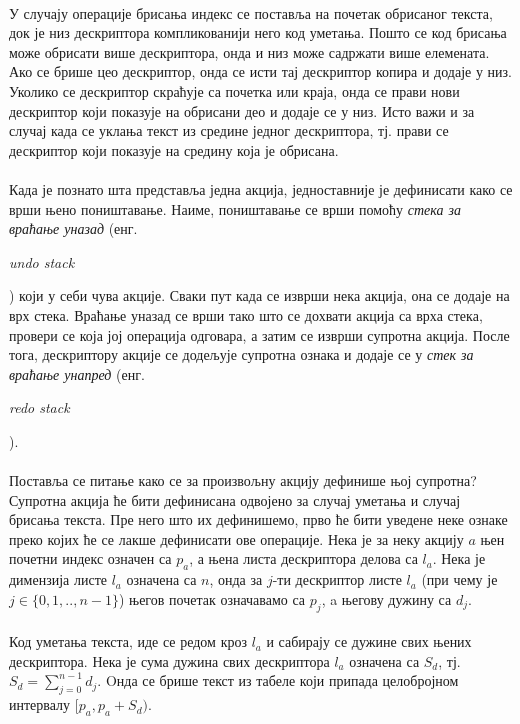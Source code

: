 \documentclass[12pt,oneside]{memoir}
\begin{document}
\paragraph{}
У случају операције брисања индекс се поставља на почетак обрисаног текста, 
док је низ дескриптора компликованији него код уметања. Пошто се код брисања
може обрисати више дескриптора, онда и низ може садржати више елемената. Ако
се брише цео дескриптор, онда се исти тај дескриптор копира и додаје у низ. Уколико се дескриптор скраћује са почетка или краја, онда се прави нови дескриптор који показује на обрисани део и додаје се у низ. Исто важи и за
случај када се уклања текст из средине једног дескриптора, тј. прави се
дескриптор који показује на средину која је обрисана.

\paragraph{}
Када је познато шта представља једна акција, једноставније је дефинисати како 
се врши њено поништавање. Наиме, поништавање се врши помоћу \emph{стека за враћање уназад} (енг. \begin{latinica}\textit{undo stack}\end{latinica}) 
који у себи чува акције. Сваки пут када се изврши нека акција, она се додаје 
на врх стека. Враћање
уназад се врши тако што се дохвати акција са врха стека, провери се која јој 
операција одговара, а затим се изврши супротна акција. После тога, дескриптору
акције се додељује супротна ознака и додаје се у \emph{стек за враћање унапред}
(енг. \begin{latinica}\textit{redo stack}\end{latinica}).

\paragraph{}
Поставља се питање како се за произвољну акцију дефинише њој супротна? 
Супротна акција ће бити дефинисана одвојено за случај уметања и случај брисања
текста. Пре него што их дефинишемо, прво ће бити уведене неке ознаке преко
којих ће се лакше дефинисати ове операције. Нека је за неку акцију \(a\)
њен почетни индекс означен са \(p_a\), а њена листа дескриптора делова
са \(l_a\). Нека је димензија листе \(l_a\) означена са \(n\), онда
за \(j\)-ти дескриптор листе \(l_a\) (при чему је \(j \in \{0,1,..,n-1\}\))
његов почетак означавамо са \(p_j\), a његову дужину са \(d_j\).

\paragraph{}
 Код уметања текста, иде се редом кроз \(l_a\) и сабирају се дужине свих њених
 дескриптора. Нека је сума дужина свих дескриптора \(l_a\) означена са \(S_d\), тј. \(S_d=\sum_{j=0}^{n-1} d_j\). Oнда се брише текст из табеле који припада целобројном
интервалу \([p_a, p_a+S_d)\).
\end{document}

